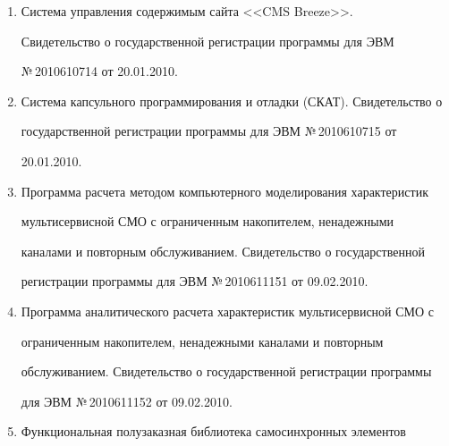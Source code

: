 \begin{enumerate}[1.]
Программа имитационного моделирования и оптимизации работы 


специализированного вычислительного центра. Свидетельство о 


государственной регистрации программы для ЭВМ №\,2010610028 от 


11.01.2010.


\item {}


Сис\-те\-ма управ\-ле\-ния содержимым сайта <<CMS Breeze>>. 


Свидетельство о государственной регистрации программы для ЭВМ 


№\,2010610714 от 20.01.2010.


\item {}


Система капсульного программирования и отладки (СКАТ). Свидетельство о 


государственной регистрации программы для ЭВМ №\,2010610715 от 


20.01.2010.


\item {}


Программа расчета методом компьютерного моделирования  характеристик  


мультисервисной  СМО  с ограниченным накопителем,  ненадежными 


каналами и повторным обслуживанием. Свидетельство о государственной 


регистрации программы для ЭВМ №\,2010611151 от 09.02.2010.


\item {}


Программа аналитического расчета характеристик  мультисервисной  СМО  с 


ограниченным накопителем, ненадежными каналами и повторным 


обслуживанием. Свидетельство о государственной регистрации программы 


для ЭВМ №\,2010611152 от 09.02.2010.


\item {}


Функциональная полузаказная библиотека самосинхронных элементов 



\end{enumerate}
